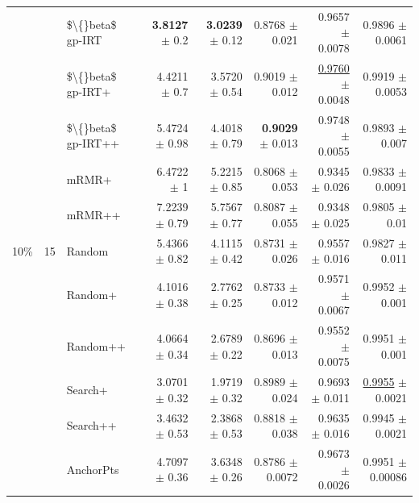 \begin{longtable}{llp{}rrrrr}
 &  & \$\textbackslash\{\}beta\$ gp-IRT & \textbf{3.8127} {\scriptsize $\pm$ 0.2} & \textbf{3.0239} {\scriptsize $\pm$ 0.12} & 0.8768 {\scriptsize $\pm$ 0.021} & 0.9657 {\scriptsize $\pm$ 0.0078} & 0.9896 {\scriptsize $\pm$ 0.0061} \\
 &  & \$\textbackslash\{\}beta\$ gp-IRT+ & 4.4211 {\scriptsize $\pm$ 0.7} & 3.5720 {\scriptsize $\pm$ 0.54} & 0.9019 {\scriptsize $\pm$ 0.012} & \underline{0.9760} {\scriptsize $\pm$ 0.0048} & 0.9919 {\scriptsize $\pm$ 0.0053} \\
 &  & \$\textbackslash\{\}beta\$ gp-IRT++ & 5.4724 {\scriptsize $\pm$ 0.98} & 4.4018 {\scriptsize $\pm$ 0.79} & \textbf{0.9029} {\scriptsize $\pm$ 0.013} & 0.9748 {\scriptsize $\pm$ 0.0055} & 0.9893 {\scriptsize $\pm$ 0.007} \\
 &  & mRMR+ & 6.4722 {\scriptsize $\pm$ 1} & 5.2215 {\scriptsize $\pm$ 0.85} & 0.8068 {\scriptsize $\pm$ 0.053} & 0.9345 {\scriptsize $\pm$ 0.026} & 0.9833 {\scriptsize $\pm$ 0.0091} \\
 &  & mRMR++ & 7.2239 {\scriptsize $\pm$ 0.79} & 5.7567 {\scriptsize $\pm$ 0.77} & 0.8087 {\scriptsize $\pm$ 0.055} & 0.9348 {\scriptsize $\pm$ 0.025} & 0.9805 {\scriptsize $\pm$ 0.01} \\
\midrule
10\% & 15 & Random & 5.4366 {\scriptsize $\pm$ 0.82} & 4.1115 {\scriptsize $\pm$ 0.42} & 0.8731 {\scriptsize $\pm$ 0.026} & 0.9557 {\scriptsize $\pm$ 0.016} & 0.9827 {\scriptsize $\pm$ 0.011} \\
 &  & Random+ & 4.1016 {\scriptsize $\pm$ 0.38} & 2.7762 {\scriptsize $\pm$ 0.25} & 0.8733 {\scriptsize $\pm$ 0.012} & 0.9571 {\scriptsize $\pm$ 0.0067} & 0.9952 {\scriptsize $\pm$ 0.001} \\
 &  & Random++ & 4.0664 {\scriptsize $\pm$ 0.34} & 2.6789 {\scriptsize $\pm$ 0.22} & 0.8696 {\scriptsize $\pm$ 0.013} & 0.9552 {\scriptsize $\pm$ 0.0075} & 0.9951 {\scriptsize $\pm$ 0.001} \\
 &  & Search+ & 3.0701 {\scriptsize $\pm$ 0.32} & 1.9719 {\scriptsize $\pm$ 0.32} & 0.8989 {\scriptsize $\pm$ 0.024} & 0.9693 {\scriptsize $\pm$ 0.011} & \underline{0.9955} {\scriptsize $\pm$ 0.0021} \\
 &  & Search++ & 3.4632 {\scriptsize $\pm$ 0.53} & 2.3868 {\scriptsize $\pm$ 0.53} & 0.8818 {\scriptsize $\pm$ 0.038} & 0.9635 {\scriptsize $\pm$ 0.016} & 0.9945 {\scriptsize $\pm$ 0.0021} \\
 &  & AnchorPts & 4.7097 {\scriptsize $\pm$ 0.36} & 3.6348 {\scriptsize $\pm$ 0.26} & 0.8786 {\scriptsize $\pm$ 0.0072} & 0.9673 {\scriptsize $\pm$ 0.0026} & 0.9951 {\scriptsize $\pm$ 0.00086} \\

\end{longtable}
